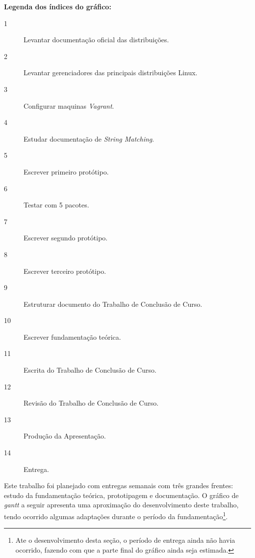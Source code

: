 \textbf{Legenda dos índices do gráfico:}
\begin{description}
\item [1]  Levantar documentação oficial das distribuições.
\item [2]  Levantar gerenciadores das principais distribuições Linux.
\item [3]  Configurar maquinas \textit{Vagrant}.
\item [4]  Estudar documentação de \textit{String Matching}.
\item [5]  Escrever primeiro protótipo.
\item [6]  Testar com 5 pacotes.
\item [7]  Escrever segundo protótipo.
\item [8]  Escrever terceiro protótipo.
\item [9]  Estruturar documento do Trabalho de Conclusão de Curso.
\item [10] Escrever fundamentação teórica.
\item [11] Escrita do Trabalho de Conclusão de Curso.
\item [12] Revisão do Trabalho de Conclusão de Curso.
\item [13] Produção da Apresentação.
\item [14] Entrega.
\end{description}

Este trabalho foi planejado com entregas semanais com três grandes frentes: estudo da fundamentação teórica, prototipagem e documentação. O gráfico de \textit{gantt} a seguir apresenta uma aproximação do desenvolvimento deste trabalho, tendo ocorrido algumas adaptações durante o período da fundamentação\footnote{Ate o desenvolvimento desta seção, o período de entrega ainda não havia ocorrido, fazendo com que a parte final do gráfico ainda seja estimada.}.
